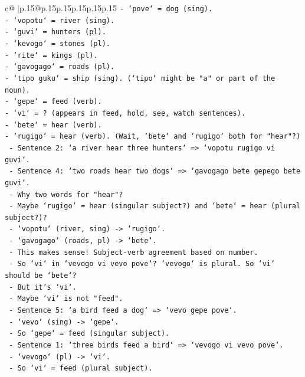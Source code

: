 \documentclass{article}
\begin{document}
{\begin{supertabular}{c@{$\;$}|p{.15\linewidth}@{}p{.15\linewidth}p{.15\linewidth}p{.15\linewidth}p{.15\linewidth}p{.15\linewidth}}
{{{\texttt{{-} `pove` = dog (sing).} \\
\texttt{{-} `vopotu` = river (sing).} \\
\texttt{{-} `guvi` = hunters (pl).} \\
\texttt{{-} `kevogo` = stones (pl).} \\
\texttt{{-} `rite` = kings (pl).} \\
\texttt{{-} `gavogago` = roads (pl).} \\
\texttt{{-} `tipo guku` = ship (sing). (`tipo` might be "a" or part of the noun).} \\
\texttt{{-} `gepe` = feed (verb).} \\
\texttt{{-} `vi` = ? (appears in feed, hold, see, watch sentences).} \\
\texttt{{-} `bete` = hear (verb).} \\
\texttt{{-} `rugigo` = hear (verb). (Wait, `bete` and `rugigo` both for "hear"?)} \\
\texttt{  {-} Sentence 2: `a river hear three hunters` => `vopotu rugigo vi guvi`.} \\
\texttt{  {-} Sentence 4: `two roads hear two dogs` => `gavogago bete gepego bete guvi`.} \\
\texttt{  {-} Why two words for "hear"?} \\
\texttt{  {-} Maybe `rugigo` = hear (singular subject?) and `bete` = hear (plural subject?)?} \\
\texttt{  {-} `vopotu` (river, sing) {-}> `rugigo`.} \\
\texttt{  {-} `gavogago` (roads, pl) {-}> `bete`.} \\
\texttt{  {-} This makes sense! Subject{-}verb agreement based on number.} \\
\texttt{  {-} So `vi` in `vevogo vi vevo pove`? `vevogo` is plural. So `vi` should be `bete`?} \\
\texttt{  {-} But it's `vi`.} \\
\texttt{  {-} Maybe `vi` is not "feed".} \\
\texttt{  {-} Sentence 5: `a bird feed a dog` => `vevo gepe pove`.} \\
\texttt{    {-} `vevo` (sing) {-}> `gepe`.} \\
\texttt{    {-} So `gepe` = feed (singular subject).} \\
\texttt{  {-} Sentence 1: `three birds feed a bird` => `vevogo vi vevo pove`.} \\
\texttt{    {-} `vevogo` (pl) {-}> `vi`.} \\
\texttt{    {-} So `vi` = feed (plural subject).} \\
}}}
\end{supertabular}}
\end{document}
